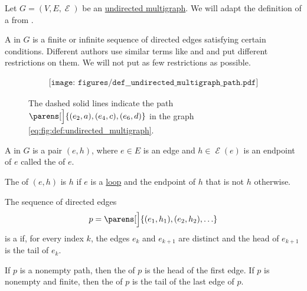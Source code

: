 \begin{definition}\label{def:undirected_multigraph_path}
  Let \( G = (V, E, \mscrE) \) be an \hyperref[def:undirected_multigraph]{undirected multigraph}. We will adapt the definition of a  from .

  A  in \( G \) is a finite or infinite sequence of directed edges satisfying certain conditions. Different authors use similar terms like  and  and put different restrictions on them. We will not put as few restrictions as possible.

  \begin{figure}
    \begin{equation}\label{eq:fig:def:undirected_multigraph_path}
      \begin{aligned}
        \texttt{[image: figures/def\_\_undirected\_multigraph\_path.pdf]}
      \end{aligned}
    \end{equation}
    \caption{The dashed solid lines indicate the path \( \parens[\Big]{ (e_2, a), (e_4, c), (e_6, d) } \) in the graph \eqref{eq:fig:def:undirected_multigraph}.}\label{fig:def:undirected_multigraph_path}
  \end{figure}

  \begin{thmenum}
     A  in \( G \) is a pair \( (e, h) \), where \( e \in E \) is an edge and \( h \in \mscrE(e) \) is an endpoint of \( e \) called the  of \( e \).

    The  of \( (e, h) \) is \( h \) if \( e \) is a \hyperref[def:hypergraph/cardinality]{loop} and the endpoint of \( h \) that is not \( h \) otherwise.

     The sequence of directed edges
    \begin{equation}\label{eq:def:undirected_multigraph_path/path}
      p = \parens[\Big]{ (e_1, h_1), (e_2, h_2), \ldots }
    \end{equation}
    is a  if, for every index \( k \), the edges \( e_k \) and \( e_{k+1} \) are distinct and the head of \( e_{k+1} \) is the tail of \( e_k \).

     If \( p \) is a nonempty path, then the  of \( p \) is the head of the first edge. If \( p \) is nonempty and finite, then the  of \( p \) is the tail of the last edge of \( p \).


\end{thmenum}
\end{definition}

